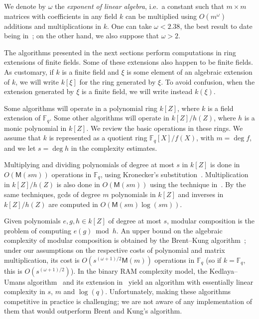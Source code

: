 \documentclass[12pt]{article}
\theoremstyle{plain}
\theoremstyle{definition}
\def\F{\ensuremath{\mathbb{F}}}
\def\MM{\ensuremath{\mathsf{M}}}
\newcounter{algorithm}
\begin{document}
We denote by $\omega$ the \emph{exponent of linear algebra}, i.e.\ a
constant such that $m\times m$ matrices with coefficients in any field
$k$ can be multiplied using $O(m^\omega)$ additions and
multiplications in $k$. One can take $\omega < 2.38$, the best result
to date being in~\cite{LeGall14}; on the other hand, we also suppose
that $\omega > 2$.

The algorithms presented in the next sections perform computations in
ring extensions of finite fields. Some of these extensions also happen
to be finite fields. As customary, if $k$ is a finite field and $\xi$
is some element of an algebraic extension of $k$, we will write
$k[\xi]$ for the ring generated by $\xi$. To avoid confusion, when the
extension generated by $\xi$ is a finite field, we will write instead
$k(\xi)$.

Some algorithms will operate in a polynomial ring $k[Z]$, where $k$ is
a field extension of $\F_q$. Some other algorithms will operate in
$k[Z]/h(Z)$, where $h$ is a monic polynomial in $k[Z]$. We review the
basic operations in these rings. We assume that $k$ is represented as
a quotient ring $\F_q[X]/f(X)$, with $m=\deg f$, and we let $s=\deg h$
in the complexity estimates.

Multiplying and dividing polynomials of degree at most $s$ in $k[Z]$
is done in $O(\MM(sm))$ operations in $\F_q$, using Kronecker's
substitution~\cite{moenck76,kaltofen87,vzGG,vzgathen+shoup92,harvey09}.
Multiplication in $k[Z]/h(Z)$ is also done in $O(\MM(sm))$ using the
technique in~\cite{pascal+schost06}. By the same techniques, gcds of
degree $m$ polynomials in $k[Z]$ and inverses in $k[Z]/h(Z)$ are
computed in $O(\MM(sm)\log(sm))$.

Given polynomials $e,g,h \in k[Z]$ of degree at most $s$, modular
composition is the problem of computing $e(g) \bmod h$. An upper bound
on the algebraic complexity of modular composition is obtained by the
Brent--Kung algorithm~\cite{brent+kung}; under our assumptions on the
respective costs of polynomial and matrix multiplication, its cost is
$O(s^{(\omega+1)/2}\MM(m))$ operations in $\F_q$
(so if $k=\F_q$, this is $O(s^{(\omega+1)/2})$). In the binary RAM
complexity model, the Kedlaya--Umans algorithm~\cite{KeUm11} and its
extension in~\cite{PoSc13a} yield an algorithm with essentially linear
complexity in $s$, $m$ and $\log(q)$. Unfortunately, making these
algorithms competitive in practice is challenging; we are not aware of
any implementation of them that would outperform Brent and Kung's
algorithm. 
\end{document}
